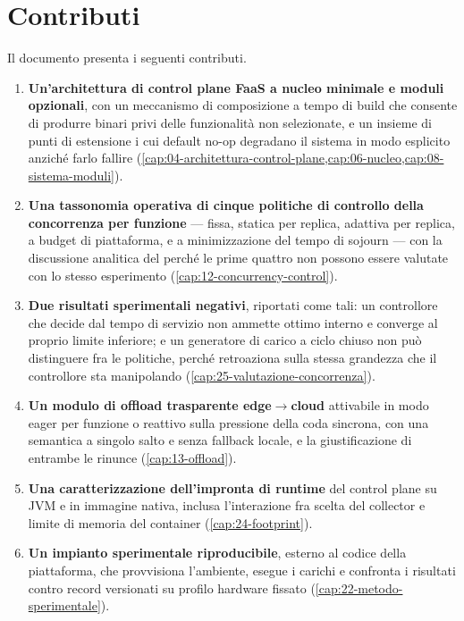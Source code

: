 \section{Contributi}

Il documento presenta i seguenti contributi.

\begin{enumerate}[leftmargin=*]
  \item \textbf{Un'architettura di control plane FaaS a nucleo minimale e moduli
  opzionali}, con un meccanismo di composizione a tempo di build che consente di
  produrre binari privi delle funzionalit\`a non selezionate, e un insieme di
  punti di estensione i cui default no-op degradano il sistema in modo esplicito
  anzich\'e farlo fallire (\cref{cap:04-architettura-control-plane,cap:06-nucleo,cap:08-sistema-moduli}).

  \item \textbf{Una tassonomia operativa di cinque politiche di controllo della
  concorrenza per funzione} --- fissa, statica per replica, adattiva per replica,
  a budget di piattaforma, e a minimizzazione del tempo di sojourn --- con la
  discussione analitica del perch\'e le prime quattro non possono essere valutate
  con lo stesso esperimento (\cref{cap:12-concurrency-control}).

  \item \textbf{Due risultati sperimentali negativi}, riportati come tali: un
  controllore che decide dal tempo di servizio non ammette ottimo interno e
  converge al proprio limite inferiore; e un generatore di carico a ciclo chiuso
  non pu\`o distinguere fra le politiche, perch\'e retroaziona sulla stessa
  grandezza che il controllore sta manipolando
  (\cref{cap:25-valutazione-concorrenza}).

  \item \textbf{Un modulo di offload trasparente edge$\to$cloud} attivabile in
  modo eager per funzione o reattivo sulla pressione della coda sincrona, con una
  semantica a singolo salto e senza fallback locale, e la giustificazione di
  entrambe le rinunce (\cref{cap:13-offload}).

  \item \textbf{Una caratterizzazione dell'impronta di runtime} del control plane
  su JVM e in immagine nativa, inclusa l'interazione fra scelta del collector e
  limite di memoria del container (\cref{cap:24-footprint}).

  \item \textbf{Un impianto sperimentale riproducibile}, esterno al codice della
  piattaforma, che provvisiona l'ambiente, esegue i carichi e confronta i
  risultati contro record versionati su profilo hardware fissato
  (\cref{cap:22-metodo-sperimentale}).
\end{enumerate}

